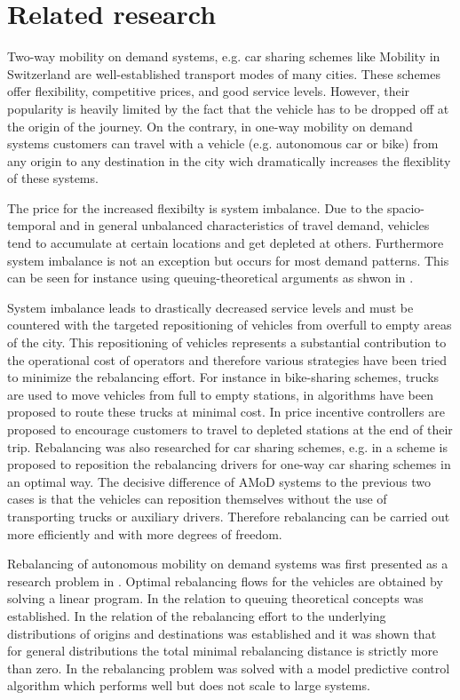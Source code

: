 \section{Related research}
\label{subs:literatureResearch}

Two-way mobility on demand systems, e.g. car sharing schemes like Mobility in
Switzerland \citep{katzev2003car} are well-established transport modes
of many cities. These schemes offer flexibility, competitive prices, and good
service levels. However, their popularity is heavily limited by the fact that
the vehicle has to be dropped off at the origin of the journey. On the contrary,
in one-way mobility on demand systems customers can travel with a vehicle (e.g.
autonomous car or bike) from any origin to any destination in the city wich
dramatically increases the flexiblity of these systems.

The price for the increased flexibilty is system imbalance. Due to the
spacio-temporal and in general unbalanced characteristics of travel demand,
vehicles tend to accumulate at certain locations and get depleted at others.
Furthermore system imbalance is not an exception but occurs for most demand
patterns. This can be seen for instance using queuing-theoretical arguments
as shwon in \citep{zhang2016control}.

System imbalance leads to drastically decreased service levels and must be
countered with the targeted repositioning of vehicles from overfull to empty
areas of the city. This repositioning of vehicles represents a substantial
contribution to the operational cost of operators and therefore various strategies
have been tried to minimize the rebalancing effort. For instance in bike-sharing
schemes, trucks are used to move vehicles from full to empty stations, in
\citep{pfrommer2014dynamic} algorithms have been proposed to route these
trucks at minimal cost. In \citep{ruch2014rule} price incentive controllers
are proposed to encourage customers to travel to depleted stations at the end
of their trip. Rebalancing was also researched for car sharing schemes, e.g.
in \citep{smith2013rebalancing} a scheme is proposed to reposition the
rebalancing drivers for one-way car sharing schemes in an optimal way. The
decisive difference of AMoD systems to the previous two
cases is that the vehicles can reposition themselves without the use of transporting
trucks or auxiliary drivers. Therefore rebalancing can be carried out more efficiently
and with more degrees of freedom.

Rebalancing of autonomous mobility on demand systems was first presented as a research
 problem in \citep{pavone2011load}. Optimal rebalancing flows for the vehicles are
 obtained by solving a linear program. In \citep{zhang2016control} the relation to
 queuing theoretical concepts was established. In \citep{treleaven2011asymptotically}
 the relation of the rebalancing effort to the underlying distributions of origins
 and destinations was established and it was shown that for general distributions
 the total minimal rebalancing distance is strictly more than zero.
 In   \citep{zhang2016model} the rebalancing problem was solved with a model
 predictive control algorithm which performs well but does not scale to large systems.

